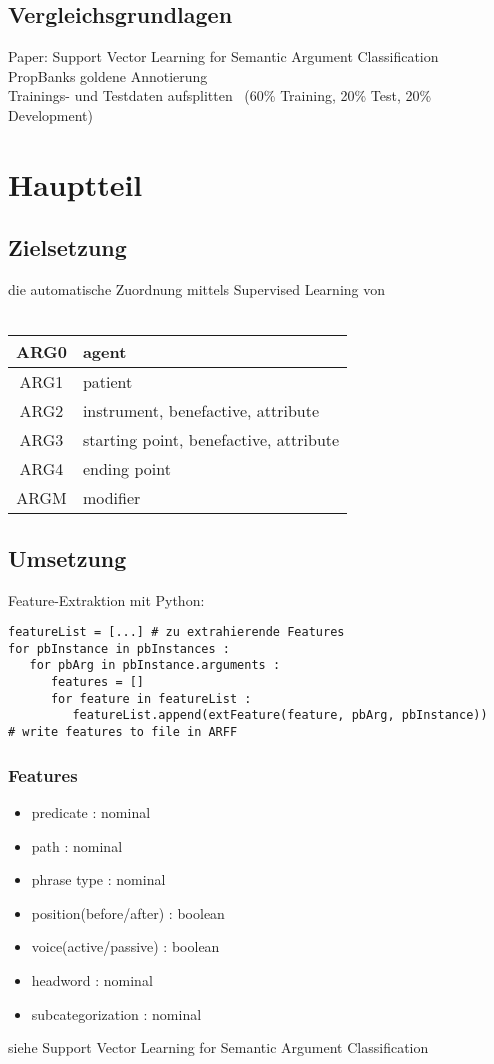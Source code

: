 \documentclass[runningheads]{llncs}
\begin{document}
\subsection{Vergleichsgrundlagen}
Paper: Support Vector Learning for Semantic Argument Classiﬁcation\\
PropBanks goldene Annotierung\\
Trainings- und Testdaten aufsplitten ~(60\% Training, 20\% Test, 20\% Development) 

\section{Hauptteil}
\subsection{Zielsetzung}
die automatische Zuordnung mittels Supervised Learning von\\
\\
\begin{table}
\centering
\begin{tabular}{|c|l|}
\hline 
ARG0 & agent \\ 
\hline 
ARG1 & patient \\ 
\hline 
ARG2 & instrument, benefactive, attribute \\ 
\hline 
ARG3 & starting point, benefactive, attribute \\ 
\hline 
ARG4 & ending point \\ 
\hline 
ARGM & modifier \\ 
\hline 
\end{tabular}
\end{table}
 
\subsection{Umsetzung}
Feature-Extraktion mit Python:
\begin{lstlisting}[frame=lines]
featureList = [...] # zu extrahierende Features
for pbInstance in pbInstances :
   for pbArg in pbInstance.arguments :
      features = []
      for feature in featureList :
         featureList.append(extFeature(feature, pbArg, pbInstance))
# write features to file in ARFF
\end{lstlisting}

\subsubsection{Features}
\begin{itemize}
\item predicate : nominal
\item path : nominal
\item phrase type : nominal
\item position(before/after) : boolean
\item voice(active/passive) : boolean
\item headword : nominal
\item subcategorization : nominal
\end{itemize}
siehe Support Vector Learning for Semantic Argument Classiﬁcation
\end{document}
